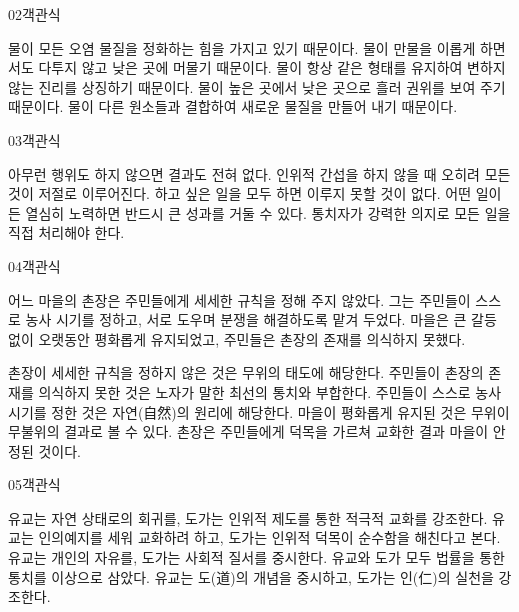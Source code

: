 \documentclass[fs85,seriesWit]{korfarm-base}
\begin{document}
\begin{kfQBlock}{02}{객관식}
\begin{kfChoices}
\kfChoice 물이 모든 오염 물질을 정화하는 힘을 가지고 있기 때문이다.
\kfChoice 물이 만물을 이롭게 하면서도 다투지 않고 낮은 곳에 머물기 때문이다.
\kfChoice 물이 항상 같은 형태를 유지하여 변하지 않는 진리를 상징하기 때문이다.
\kfChoice 물이 높은 곳에서 낮은 곳으로 흘러 권위를 보여 주기 때문이다.
\kfChoice 물이 다른 원소들과 결합하여 새로운 물질을 만들어 내기 때문이다.
\end{kfChoices}
\end{kfQBlock}

\begin{kfQBlock}{03}{객관식}
\begin{kfChoices}
\kfChoice 아무런 행위도 하지 않으면 결과도 전혀 없다.
\kfChoice 인위적 간섭을 하지 않을 때 오히려 모든 것이 저절로 이루어진다.
\kfChoice 하고 싶은 일을 모두 하면 이루지 못할 것이 없다.
\kfChoice 어떤 일이든 열심히 노력하면 반드시 큰 성과를 거둘 수 있다.
\kfChoice 통치자가 강력한 의지로 모든 일을 직접 처리해야 한다.
\end{kfChoices}
\end{kfQBlock}

\begin{kfQBlock}{04}{객관식}
\begin{kfEvidence}어느 마을의 촌장은 주민들에게 세세한 규칙을 정해 주지 않았다. 그는 주민들이 스스로 농사 시기를 정하고, 서로 도우며 분쟁을 해결하도록 맡겨 두었다. 마을은 큰 갈등 없이 오랫동안 평화롭게 유지되었고, 주민들은 촌장의 존재를 의식하지 못했다.\end{kfEvidence}
\begin{kfChoices}
\kfChoice 촌장이 세세한 규칙을 정하지 않은 것은 무위의 태도에 해당한다.
\kfChoice 주민들이 촌장의 존재를 의식하지 못한 것은 노자가 말한 최선의 통치와 부합한다.
\kfChoice 주민들이 스스로 농사 시기를 정한 것은 자연(自然)의 원리에 해당한다.
\kfChoice 마을이 평화롭게 유지된 것은 무위이무불위의 결과로 볼 수 있다.
\kfChoice 촌장은 주민들에게 덕목을 가르쳐 교화한 결과 마을이 안정된 것이다.
\end{kfChoices}
\end{kfQBlock}

\begin{kfQBlock}{05}{객관식}
\begin{kfChoices}
\kfChoice 유교는 자연 상태로의 회귀를, 도가는 인위적 제도를 통한 적극적 교화를 강조한다.
\kfChoice 유교는 인의예지를 세워 교화하려 하고, 도가는 인위적 덕목이 순수함을 해친다고 본다.
\kfChoice 유교는 개인의 자유를, 도가는 사회적 질서를 중시한다.
\kfChoice 유교와 도가 모두 법률을 통한 통치를 이상으로 삼았다.
\kfChoice 유교는 도(道)의 개념을 중시하고, 도가는 인(仁)의 실천을 강조한다.
\end{kfChoices}
\end{kfQBlock}
\end{document}
